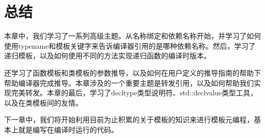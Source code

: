 \section{总结}
本章中，我们学习了一系列高级主题。从名称绑定和依赖名称开始，并学习了如何使用typename和模板关键字来告诉编译器引用的是哪种依赖名称。然后，学习了递归模板，以及如何使用不同的方法实现递归函数的编译时版本。

还学习了函数模板和类模板的参数推导，以及如何在用户定义的推导指南的帮助下帮助编译器完成推导。本章涉及的一个重要主题是转发引用，以及如何帮助我们实现完美转发。本章的最后，学习了decltype类型说明符、std::declvalue类型工具，以及在类模板间的友情。

下一章中，我们将开始利用目前为止积累的关于模板的知识来进行模板元编程，基本上就是编写在编译时运行的代码。